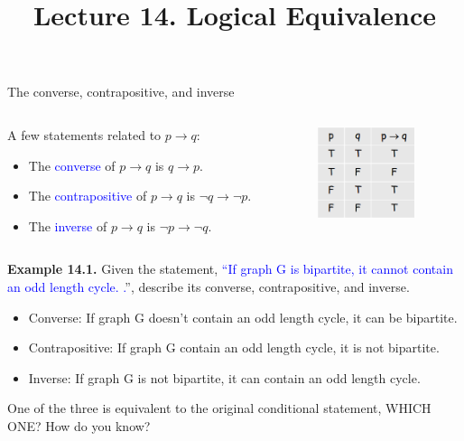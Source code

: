\documentclass[aspectratio=169]{beamer}
\title{Lecture 14. Logical Equivalence}
\date{ }
\providecommand{\Blue}[1]{\textcolor{blue}{#1}}
\begin{document}
\frame[plain]{\titlepage}

\begin{frame}[plain]{The converse, contrapositive, and inverse}

 \begin{columns}[onlytextwidth]
   \begin{column}{0.6\textwidth}
     A few statements related to $p\rightarrow q$:
     \begin{itemize}
      \item The \Blue{converse} of $p\rightarrow q$ is $q\rightarrow p$.
      \item The \Blue{contrapositive} of $p\rightarrow q$ is $\neg q\rightarrow \neg p$.
      \item The \Blue{inverse} of $p\rightarrow q$ is $\neg p\rightarrow \neg q$.
     \end{itemize}

   \end{column}
  \begin{column}{0.4\textwidth}
    \centering
    \includegraphics[height=2.7cm]{./img/lecture14-fig1.png}
  \end{column}

 \end{columns}\pause 
 
 {\bf Example 14.1.} Given the statement,
      \Blue{``If graph G is bipartite, it cannot contain an odd length cycle.
.}'', 
 describe its converse, contrapositive, and inverse. \pause 
\begin{itemize}
  \item Converse: If graph G doesn't contain an odd length cycle,
       it can be bipartite. \pause
  \item Contrapositive: 
     If graph G contain an odd length cycle, it is not bipartite.\pause
  \item Inverse: If graph G is not bipartite, 
     it can contain an odd length cycle.
\end{itemize}

\pause 

   One of the three is equivalent to the original conditional statement,
WHICH ONE? How do you know?
 
\end{frame}
\end{document}
